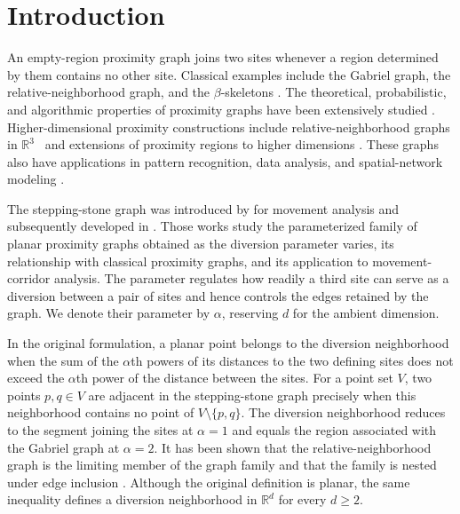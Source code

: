 \documentclass[a4paper,fleqn]{cas-dc}
\theoremstyle{definition}
\theoremstyle{remark}
\newcommand{\R}{\mathds{R}}
\newcommand{\0}{\mathbf{0}}
\begin{document}

\section{Introduction}
An empty-region proximity graph joins two sites whenever a region
determined by them contains no other site. Classical examples include
the Gabriel graph, the relative-neighborhood graph, and the
$\beta$-skeletons
\citep{gabriel1969statistical,toussaint1980relative,
jaromczyk1992relative,kirkpatrick1985framework}.
The theoretical, probabilistic, and algorithmic properties of proximity
graphs have been extensively studied
\citep{bose2013spanners,devroye1988expected,cardinal2009empty}.
Higher-dimensional proximity constructions include
relative-neighborhood graphs in $\R^3$~\citep{agarwal1992relative} and
extensions of proximity regions to higher dimensions
\citep{ceyhan2010extension}.
These graphs also have applications in pattern recognition, data analysis,
and spatial-network modeling
\citep{jaromczyk1992relative,watanabe2008evaluating}.

The stepping-stone graph was introduced by
\citet{kannangara2018stepping} for movement analysis and subsequently
developed in
\citep{kannangara2019stepping}. Those works study the parameterized family
of planar proximity graphs obtained as the diversion parameter varies, its
relationship with classical proximity graphs, and its application to
movement-corridor analysis.
The parameter regulates how readily a third site can serve as a
diversion between a pair of sites and hence controls the edges retained by
the graph. We denote their parameter by $\alpha$, reserving $d$ for the
ambient dimension.


In the original formulation,
a planar point belongs to the diversion neighborhood
when the sum of the $\alpha$th powers of its distances to the two defining
sites does not exceed the $\alpha$th power of the distance between the
sites. For a point set $V$, two points $p,q\in V$ are adjacent in the
stepping-stone graph precisely when this neighborhood contains no point of
$V\setminus\{p,q\}$.
The diversion neighborhood reduces to the segment
joining the sites at $\alpha=1$ and equals the region associated with the
Gabriel graph at $\alpha=2$.
It has been shown that the relative-neighborhood graph is the limiting
member of the graph family and that the family is nested under edge inclusion
\citep{kannangara2018stepping,kannangara2019stepping}.
Although the original definition is planar, the same inequality defines a
diversion neighborhood
in $\R^d$ for every $d\geq2$.
\end{document}
